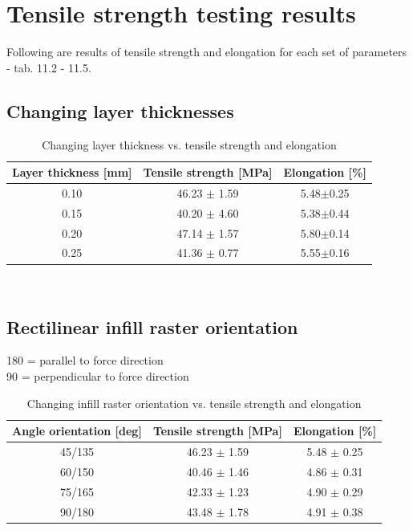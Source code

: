 \documentclass[a4paper, 11pt, reqno]{report}
\begin{document}
%
\newpage
\section{Tensile strength testing results}
Following are results of tensile strength and elongation for each set of parameters - tab. 11.2 - 11.5.
\\[30pt]
\subsection{Changing layer thicknesses}
\begin{table}[h!]
\begin{tabular}{|c|c|c|}
\hline 
Layer thickness [mm] & Tensile strength [MPa] & Elongation [\%]\\ 
\hline 
0.10 & 46.23 $\pm$ 1.59 & 5.48$\pm$0.25\\ 
\hline 
0.15 & 40.20 $\pm$ 4.60 & 5.38$\pm$0.44\\ 
\hline 
0.20 & 47.14 $\pm$ 1.57 & 5.80$\pm$0.14\\ 
\hline 
0.25 & 41.36 $\pm$ 0.77 & 5.55$\pm$0.16\\ 
\hline 
\end{tabular}
\\
\begin{minipage}{0.7\textwidth}
\caption[justification=justified,singlelinecheck=false]{Changing layer thickness vs. tensile strength and elongation
\\[30pt]}
\end{minipage}
\end{table}
%
%
%
\subsection{Rectilinear infill raster orientation}
180 = parallel to force direction\\
90 = perpendicular to force direction
\begin{table}[h!]
\begin{tabular}{|c|c|c|}
\hline 
Angle orientation [deg] & Tensile strength [MPa] & Elongation [\%]\\ 
\hline 
45/135 & 46.23 $\pm$ 1.59 & 5.48 $\pm$ 0.25\\ 
\hline 
60/150 & 40.46  $\pm$ 1.46 & 4.86 $\pm$ 0.31\\ 
\hline 
75/165 & 42.33 $\pm$ 1.23 & 4.90 $\pm$ 0.29\\ 
\hline 
90/180 & 43.48 $\pm$ 1.78 & 4.91 $\pm$ 0.38\\ 
\hline 
\end{tabular}
\\
\begin{minipage}{0.8\textwidth}
\raggedleft
\caption[justification=justified,singlelinecheck=false]{Changing infill raster orientation vs. tensile strength and elongation\\[30pt]}
\end{minipage}
\end{table}
%
%
%
\end{document}
